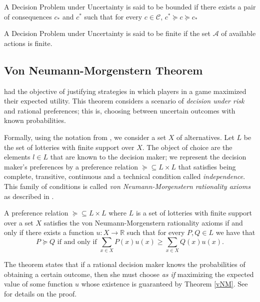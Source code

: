 \documentclass{svjour3}                     %
\begin{document}
\begin{definition}
A Decision Problem under Uncertainty is said to be bounded if there exists a pair of consequences $c_\ast$ and $c^\ast$ such that for every $c \in \mathcal{C}$, $c^{\ast} \succeq c \succeq c_\ast$
\end{definition}

\begin{definition}
A Decision Problem under Uncertainty is said to be finite if the set $\mathcal{A}$ of available actions is finite.
\end{definition}

\subsection{Von Neumann-Morgenstern Theorem}
\label{vNM-M}
\cite{von1944theory} had the objective of justifying strategies in which players in a game maximized their expected utility. This theorem considers a scenario of \textit{decision under risk} and rational preferences; this is, choosing between uncertain outcomes with known probabilities. 

Formally, using the notation from \cite{gilboa2009decision}, we consider a set $X$ of alternatives. Let $L$ be the set of lotteries with finite support over $X$. The object of choice are the elements $l \in L$ that are known to the decision maker; we represent the decision maker's preferences by a preference relation $\succeq \subseteq L \times L$ that  satisfies being complete, transitive, continuous and a technical condition called \textit{independence}. This family of conditions is called \textit{von Neumann-Morgenstern rationality axioms} as described in \cite{gilboa2009decision}.
\begin{theorem}{\label{vNM}}
A preference relation $\succeq \subseteq L \times L$ where $L$ is a set of lotteries with finite support over a set $X$ satisfies the von Neumann-Morgenstern rationality axioms if and only if there exists a function $u: X \to \mathbb{R}$ such that for every $P, Q \in L$ we have that
\begin{equation}
P \succeq Q \textrm{ if and only if } \sum_{x \in X} P(x) u(x) \geq \sum_{x \in X} Q(x) u(x). 
\end{equation}
\end{theorem}
The theorem states that if a rational decision maker knows the probabilities of obtaining a certain outcome, then she must choose \textit{as if} maximizing the expected value of some function $u$ whose existence is guaranteed by Theorem \ref{vNM}. See \cite{gilboa2009decision} for details on the proof.
\end{document}
